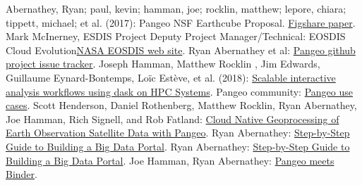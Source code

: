 \documentclass{article}
\begin{document}
\begin{thebibliography}{00}
 Abernathey, Ryan; paul, kevin; hamman, joe; rocklin, matthew; lepore, chiara; tippett, michael; et al. (2017): Pangeo NSF Earthcube Proposal. \href{https://figshare.com/articles/Pangeo_NSF_Earthcube_Proposal/5361094}{Figshare paper}. 
 Mark McInerney, ESDIS Project Deputy Project Manager/Technical: EOSDIS Cloud Evolution\href{https://earthdata.nasa.gov/about/eosdis-cloud-evolution}{NASA EOSDIS web site}. 
 Ryan Abernathey et al: \href{https://github.com/pangeo-data/pangeo/issues}{Pangeo github project issue tracker}. 
  Joseph Hamman, Matthew Rocklin , Jim Edwards, Guillaume Eynard-Bontemps, Loïc Estève, et al. (2018): \href{https://medium.com/pangeo/dask-jobqueue-d7754e42ca53}{Scalable interactive analysis workflows using dask on HPC Systems}. 
  Pangeo community: \href{http://pangeo.io/use_cases/index.html}{Pangeo use cases}. 
 Scott Henderson, Daniel Rothenberg, Matthew Rocklin, Ryan Abernathey, Joe Hamman, Rich Signell, and Rob Fatland: \href{https://medium.com/pangeo/cloud-native-geoprocessing-of-earth-observation-satellite-data-with-pangeo-997692d91ca2}{Cloud Native Geoprocessing of Earth Observation Satellite Data with Pangeo}. 
 Ryan Abernathey: \href{https://medium.com/pangeo/step-by-step-guide-to-building-a-big-data-portal-e262af1c2977}{Step-by-Step Guide to Building a Big Data Portal}.
 Ryan Abernathey: \href{https://medium.com/pangeo/step-by-step-guide-to-building-a-big-data-portal-e262af1c2977}{Step-by-Step Guide to Building a Big Data Portal}.
 Joe Hamman, Ryan Abernathey: \href{https://medium.com/pangeo/pangeo-meets-binder-2ea923feb34f}{Pangeo meets Binder}.
\end{thebibliography}
\end{document}
